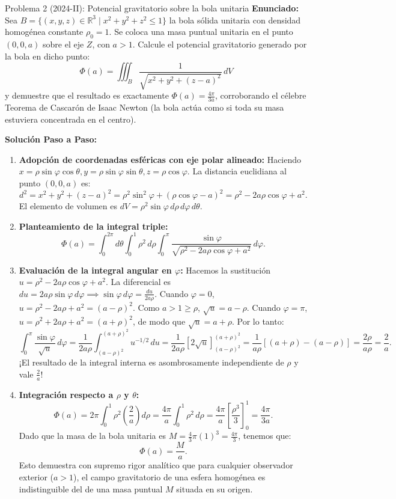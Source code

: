 \documentclass[11pt,a4paper]{article}
\begin{document}
\begin{ejerciciobox}{Problema 2 (2024-II): Potencial gravitatorio sobre la bola unitaria}
\textbf{Enunciado:} Sea $B = \{ (x,y,z) \in \mathbb{R}^3 \mid x^2 + y^2 + z^2 \leq 1 \}$ la bola sólida unitaria con densidad homogénea constante $\rho_0 = 1$. Se coloca una masa puntual unitaria en el punto $(0,0,a)$ sobre el eje $Z$, con $a > 1$.
Calcule el potencial gravitatorio generado por la bola en dicho punto:
\[
\Phi(a) = \iiint_B \frac{1}{\sqrt{x^2 + y^2 + (z - a)^2}} \, dV
\]
y demuestre que el resultado es exactamente $\Phi(a) = \frac{4\pi}{3a}$, corroborando el célebre Teorema de Cascarón de Isaac Newton (la bola actúa como si toda su masa estuviera concentrada en el centro).

\tcblower
\textbf{Solución Paso a Paso:}
\begin{enumerate}[leftmargin=*]
\item \textbf{Adopción de coordenadas esféricas con eje polar alineado:}
Haciendo $x = \rho \sin\varphi \cos\theta, y = \rho \sin\varphi \sin\theta, z = \rho \cos\varphi$.
La distancia euclidiana al punto $(0,0,a)$ es:
\[
d^2 = x^2 + y^2 + (z - a)^2 = \rho^2 \sin^2\varphi + (\rho\cos\varphi - a)^2 = \rho^2 - 2a\rho\cos\varphi + a^2.
\]
El elemento de volumen es $dV = \rho^2 \sin\varphi \, d\rho \, d\varphi \, d\theta$.
\item \textbf{Planteamiento de la integral triple:}
\[
\Phi(a) = \int_0^{2\pi} d\theta \int_0^1 \rho^2 \, d\rho \int_0^\pi \frac{\sin\varphi}{\sqrt{\rho^2 - 2a\rho\cos\varphi + a^2}} \, d\varphi.
\]
\item \textbf{Evaluación de la integral angular en $\varphi$:}
Hacemos la sustitución $u = \rho^2 - 2a\rho\cos\varphi + a^2$.
La diferencial es $du = 2a\rho \sin\varphi \, d\varphi \implies \sin\varphi \, d\varphi = \frac{du}{2a\rho}$.
Cuando $\varphi = 0$, $u = \rho^2 - 2a\rho + a^2 = (a - \rho)^2$. Como $a > 1 \geq \rho$, $\sqrt{u} = a - \rho$.
Cuando $\varphi = \pi$, $u = \rho^2 + 2a\rho + a^2 = (a + \rho)^2$, de modo que $\sqrt{u} = a + \rho$.
Por lo tanto:
\[
\int_0^\pi \frac{\sin\varphi}{\sqrt{u}} \, d\varphi = \frac{1}{2a\rho} \int_{(a-\rho)^2}^{(a+\rho)^2} u^{-1/2} \, du = \frac{1}{2a\rho} [2\sqrt{u}]_{(a-\rho)^2}^{(a+\rho)^2} = \frac{1}{a\rho} \left[ (a + \rho) - (a - \rho) \right] = \frac{2\rho}{a\rho} = \frac{2}{a}.
\]
¡El resultado de la integral interna es asombrosamente independiente de $\rho$ y vale $\frac{2}{a}$!
\item \textbf{Integración respecto a $\rho$ y $\theta$:}
\[
\Phi(a) = 2\pi \int_0^1 \rho^2 \left( \frac{2}{a} \right) d\rho = \frac{4\pi}{a} \int_0^1 \rho^2 \, d\rho = \frac{4\pi}{a} \left[ \frac{\rho^3}{3} \right]_0^1 = \frac{4\pi}{3a}.
\]
Dado que la masa de la bola unitaria es $M = \frac{4}{3}\pi(1)^3 = \frac{4\pi}{3}$, tenemos que:
\[
\Phi(a) = \frac{M}{a}.
\]
Esto demuestra con supremo rigor analítico que para cualquier observador exterior ($a > 1$), el campo gravitatorio de una esfera homogénea es indistinguible del de una masa puntual $M$ situada en su origen.
\end{enumerate}
\end{ejerciciobox}
\end{document}
